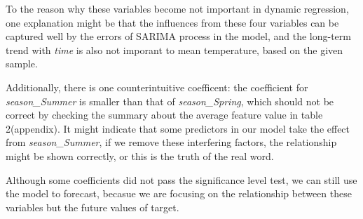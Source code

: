 \documentclass[12pt]{article}
\begin{document}
To the reason why these variables become not important in dynamic regression,
one explanation might be that the influences from these four variables can be captured
well by the errors of SARIMA process in the model, and the long-term trend with \textit{time} is also
not imporant to mean temperature, based on the given sample.

Additionally, there is one counterintuitive coefficent: the coefficient
for \textit{season\_Summer} is smaller than that of \textit{season\_Spring}, which should 
not be correct by checking the summary about the average feature value in table 2(appendix).
It might indicate that some predictors in our model take the effect from \textit{season\_Summer},
if we remove these interfering factors, the relationship might be shown correctly, or this is 
the truth of the real word.

Although some coefficients did not pass the significance level test, we can still
use the model to forecast, becasue we are focusing on the relationship between these
variables but the future values of target. 
\end{document}
